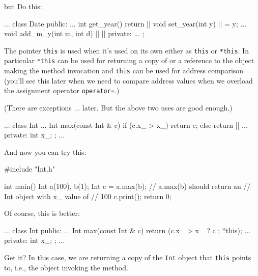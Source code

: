 but  Do this:

\begin{consolethree}[escapeinside=||]
...
class Date
{
public:
    ...
    int get_year()
    {
        return ||
    }
    void set_year(int y)
    {
        || = y;
    }
    ...
    void add_m_y(int m, int d)
    {
        ||
        ||
    }
private:
    ...
};
\end{consolethree}

The pointer \texttt{this} is used when it's used on its own either as
\texttt{this} or \texttt{*this}. In particular \texttt{*this} can be used for
returning a copy of or a reference to the object making the method
invocation and \texttt{this} can be used for address comparison
(you'll see this later when we need to compare address
values when we overload the assignment operator \texttt{operator=}.)

(There are exceptions ... later. But the above two uses are good
enough.)


\newpage{}

\begin{consolethree}[escapeinside=||]
...
class Int
{
    ...
    Int max(const Int & c)
    {
        if (c.x_ > x_)
            return c;
        else
            return ||
    }
    ...
private:
    int x_;
};
...
\end{consolethree}

And now you can try this:

\begin{consolethree}[escapeinside=||]
#include "Int.h"

int main()
{
    Int a(100), b(1);
    Int c = a.max(b); // a.max(b) should return an
                      // Int object with x_ value of
                      // 100
    c.print();
    return 0;
}
\end{consolethree}

Of course, this is better:

\begin{consolethree}[escapeinside=||]
...
class Int
{
public:
    ...
    Int max(const Int & c)
    {
        return (c.x_ > x_ ? c : *this);
    }
    ...
private:
    int x_;
};
...
\end{consolethree}

Get it? In this case, we are returning a copy of the \texttt{Int} object
that \texttt{this} points to, i.e., the object invoking the method.

